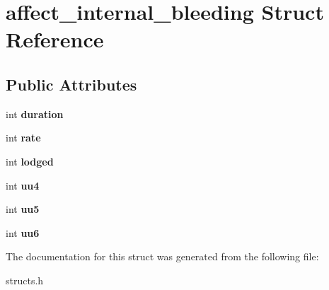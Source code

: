 \hypertarget{structaffect__internal__bleeding}{\section{affect\-\_\-internal\-\_\-bleeding Struct Reference}
\label{structaffect__internal__bleeding}
}
\subsection*{Public Attributes}
\begin{DoxyCompactItemize}
\item 
\hypertarget{structaffect__internal__bleeding_ac47f6f0789f357e65723951586f16e72}{int {\bfseries duration}}\label{structaffect__internal__bleeding_ac47f6f0789f357e65723951586f16e72}

\item 
\hypertarget{structaffect__internal__bleeding_a50546b9b73e9946128293772340d5772}{int {\bfseries rate}}\label{structaffect__internal__bleeding_a50546b9b73e9946128293772340d5772}

\item 
\hypertarget{structaffect__internal__bleeding_a6364cd4e594140695a5ddb5977061329}{int {\bfseries lodged}}\label{structaffect__internal__bleeding_a6364cd4e594140695a5ddb5977061329}

\item 
\hypertarget{structaffect__internal__bleeding_a1fb1f660b7af8e3e038f270bf933967a}{int {\bfseries uu4}}\label{structaffect__internal__bleeding_a1fb1f660b7af8e3e038f270bf933967a}

\item 
\hypertarget{structaffect__internal__bleeding_a29bcc0465cb4664ddc088b2d6e9b54f8}{int {\bfseries uu5}}\label{structaffect__internal__bleeding_a29bcc0465cb4664ddc088b2d6e9b54f8}

\item 
\hypertarget{structaffect__internal__bleeding_ab9138c48b2d0b5498cf0b803262de54f}{int {\bfseries uu6}}\label{structaffect__internal__bleeding_ab9138c48b2d0b5498cf0b803262de54f}

\end{DoxyCompactItemize}


The documentation for this struct was generated from the following file\-:\begin{DoxyCompactItemize}
\item 
structs.\-h\end{DoxyCompactItemize}
